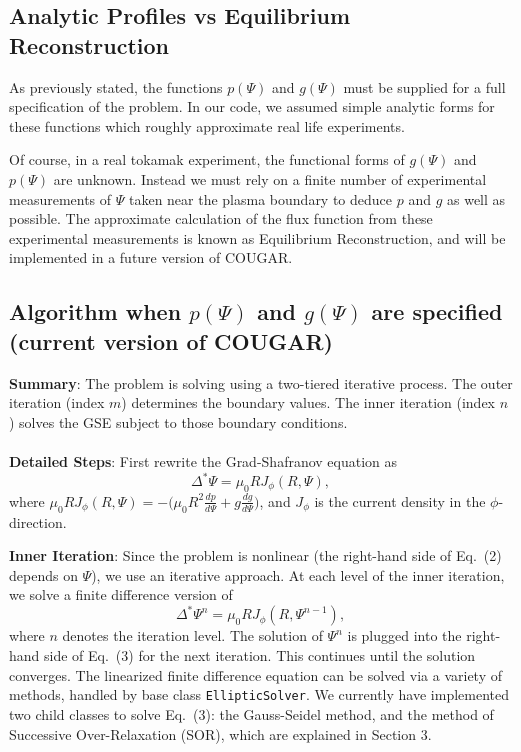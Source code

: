 \documentclass[paper=letter, fontsize=11pt]{scrartcl} %
\begin{document}
\subsection{Analytic Profiles vs Equilibrium Reconstruction}
As previously stated, the functions $p(\Psi)$ and $g(\Psi)$ must be supplied for a full specification of the problem.  In our code, we assumed simple analytic forms for these functions which roughly approximate real life experiments.  

Of course, in a real tokamak experiment, the functional forms of $g(\Psi)$ and $p(\Psi)$ are unknown.  Instead we must rely on a finite number of experimental measurements of $\Psi$ taken near the plasma boundary to deduce $p$ and $g$ as well as possible.  The approximate calculation of the flux function from these experimental measurements is known as Equilibrium Reconstruction, and will be implemented in a future version of COUGAR.  

\subsection{Algorithm when $p(\Psi)$ and $g(\Psi)$ are specified (current version of COUGAR)}

\textbf{Summary}: The problem is solving using a two-tiered iterative process.  The outer iteration (index $m$) determines the boundary values.  The inner iteration (index $n$) solves the GSE subject to those boundary conditions.
\\ \\
\textbf{Detailed Steps}: First rewrite the Grad-Shafranov equation as
\begin{equation}
\Delta^{*}\Psi = \mu_0 R J_{\phi} (R, \Psi),
\end{equation}
where $\mu_0 R J_{\phi} (R,\Psi) = - \big(\mu_0 R^2 \frac{d p}{d\Psi} + g \frac{d g}{d\Psi}\big)$, and $J_{\phi}$ is the current density in the $\phi$-direction.

\textbf{Inner Iteration}: Since the problem is nonlinear (the right-hand side of Eq.~(2) depends on $\Psi$), we use an iterative approach.  At each level of the inner iteration, we solve a finite difference version of 
\begin{equation}
\Delta^{*}\Psi^{n} = \mu_0 R J_\phi (R, \Psi^{n-1}),
\end{equation}
where $n$ denotes the iteration level. The solution of $\Psi^n$ is plugged into the right-hand side of Eq.~(3) for the next iteration.  This continues until the solution converges.  The linearized finite difference equation can be solved via a variety of methods, handled by base class \texttt{EllipticSolver}.  We currently have implemented two child classes to solve Eq.~(3): the Gauss-Seidel method, and the method of Successive Over-Relaxation (SOR), which are explained in Section 3.  
\end{document}
